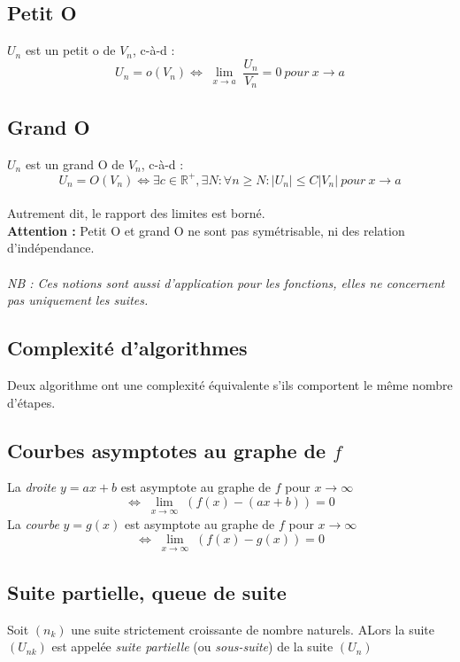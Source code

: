\documentclass	[11pt, a4paper, openany]{book}
\begin{document}
\subsection*{Petit O}
$U_{n}$ est un petit o de $V_{n}$, c-à-d :\\ 
$$U_{n} = o(V_{n}) \Leftrightarrow \lim\limits_{\substack{x \to a}} \frac{U_{n}}{V_{n}} = 0\ pour\ x \rightarrow a$$
\subsection*{Grand O}
$U_{n}$ est un grand O de $V_{n}$, c-à-d :
$$U_{n} = O(V_{n}) \Leftrightarrow \exists c \in \mathbb{R}^{+}, \exists N : \forall n \geq N : |U_{n}| \leq C|V_{n}|\ pour\ x \rightarrow a$$ \\
Autrement dit, le rapport des limites est borné.\\
\textbf{Attention : } Petit O et grand O ne sont pas symétrisable, ni des relation d'indépendance.\\
\\
\textit{NB : Ces notions sont aussi d'application pour les fonctions, elles ne concernent pas uniquement les suites.}

\subsection{Complexité d'algorithmes}
Deux algorithme ont une complexité équivalente s'ils comportent le même nombre d'étapes.

\subsection{Courbes asymptotes au graphe de $f$}
La \textit{droite} $y = ax + b$ est asymptote au graphe de $f$ pour $x \rightarrow \infty$ 
$$ \Leftrightarrow \lim\limits_{\substack{x \to \infty}} (f(x) - (ax+b)) = 0$$
La \textit{courbe} $y=g(x)$ est asymptote au graphe de $f$ pour $x \rightarrow \infty$ 
$$ \Leftrightarrow \lim\limits_{\substack{x \to \infty}} (f(x) - g(x)) = 0$$

\subsection{Suite partielle, queue de suite}
Soit $(n_{k})$ une suite strictement croissante de nombre naturels. ALors la suite $(U_{nk})$ est appelée \textit{suite partielle} (ou \textit{sous-suite}) de la suite $(U_{n})$
\end{document}
